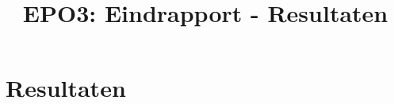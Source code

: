 \documentclass{scrartcl} %
\author{}
\title{EPO3: Eindrapport - Resultaten}
\begin{document}
\chapter{Resultaten}
\label{ch:resultaten}
\end{document}
